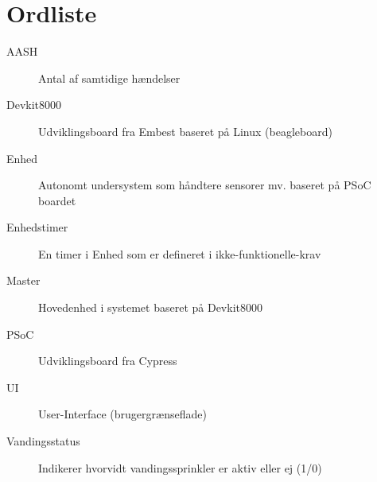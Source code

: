 \chapter{Ordliste}


\begin{description}

\item[AASH] Antal af samtidige hændelser
\item[Devkit8000] Udviklingsboard fra Embest baseret på Linux (beagleboard)
\item[Enhed] Autonomt undersystem som håndtere sensorer mv. baseret på PSoC boardet
\item[Enhedstimer] En timer i Enhed som er defineret i ikke-funktionelle-krav
\item[Master] Hovedenhed i systemet baseret på Devkit8000
\item[PSoC] Udviklingsboard fra Cypress
\item[UI] User-Interface (brugergrænseflade)
\item[Vandingsstatus] Indikerer hvorvidt vandingssprinkler er aktiv eller ej (1/0)

\end{description}